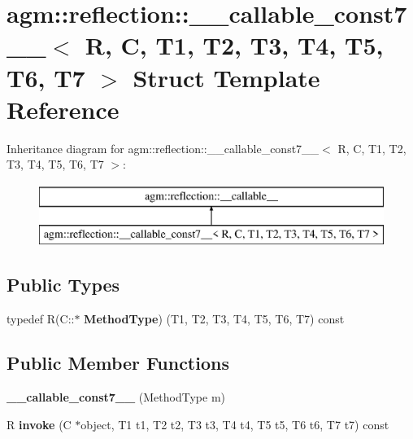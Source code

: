 \hypertarget{structagm_1_1reflection_1_1____callable__const7____}{}\section{agm\+:\+:reflection\+:\+:\+\_\+\+\_\+callable\+\_\+const7\+\_\+\+\_\+$<$ R, C, T1, T2, T3, T4, T5, T6, T7 $>$ Struct Template Reference}
\label{structagm_1_1reflection_1_1____callable__const7____}
Inheritance diagram for agm\+:\+:reflection\+:\+:\+\_\+\+\_\+callable\+\_\+const7\+\_\+\+\_\+$<$ R, C, T1, T2, T3, T4, T5, T6, T7 $>$\+:\begin{figure}[H]
\begin{center}
\leavevmode
\includegraphics[height=2.000000cm]{structagm_1_1reflection_1_1____callable__const7____}
\end{center}
\end{figure}
\subsection*{Public Types}
\begin{DoxyCompactItemize}
\item 
typedef R(C\+::$\ast$ {\bfseries Method\+Type}) (T1, T2, T3, T4, T5, T6, T7) const \hypertarget{structagm_1_1reflection_1_1____callable__const7_____aa2db73f8538e456fee0741a70209719f}{}\label{structagm_1_1reflection_1_1____callable__const7_____aa2db73f8538e456fee0741a70209719f}

\end{DoxyCompactItemize}
\subsection*{Public Member Functions}
\begin{DoxyCompactItemize}
\item 
{\bfseries \+\_\+\+\_\+callable\+\_\+const7\+\_\+\+\_\+} (Method\+Type m)\hypertarget{structagm_1_1reflection_1_1____callable__const7_____a8fca135f20dd8697d08f031518c40dcb}{}\label{structagm_1_1reflection_1_1____callable__const7_____a8fca135f20dd8697d08f031518c40dcb}

\item 
R {\bfseries invoke} (C $\ast$object, T1 t1, T2 t2, T3 t3, T4 t4, T5 t5, T6 t6, T7 t7) const \hypertarget{structagm_1_1reflection_1_1____callable__const7_____a77d4b7a6a0b0e0d64195983f52d111b1}{}\label{structagm_1_1reflection_1_1____callable__const7_____a77d4b7a6a0b0e0d64195983f52d111b1}

\end{DoxyCompactItemize}

